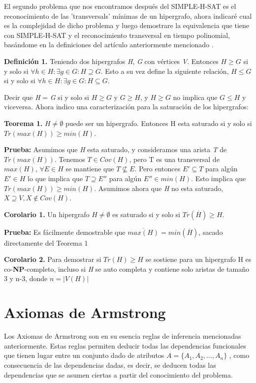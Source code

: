 \documentclass{cosas/tfg_domingo}
\begin{document}
El segundo problema que nos encontramos después del SIMPLE-H-SAT es el reconocimiento de las 'transversals' mínimas de un hipergrafo, ahora indicaré cual es la complejidad de dicho problema y luego demostrare la equivalencia que tiene con SIMPLE-H-SAT y el reconocimiento transversal en tiempo polinomial, basándome en la definiciones del artículo anteriormente mencionado \citep{Thomas}.


\textbf{Definición 1.} Teniendo dos hipergrafos \textit{H}, \textit{G} con vértices \textit{V}. Entonces $H \geq G$ si y solo si $\forall h \in H : \exists g \in G : H \supseteq G$. Esto a su vez define la siguiente relación,  $H \leq G$ si y solo si $\forall h \in H : \exists g \in G : H \subseteq G$.

Decir que  \textit{H} = \textit{G} si y solo si $H \geq G$ y $G \geq H$, y $H \geq G$ no implica que $G \leq H$ y viceversa. Ahora indico una caracterización para la saturación de los hipergrafos:

\textbf{Teorema 1.} $H \neq \emptyset$ puede ser un hipergrafo. Entonces H esta saturado si y solo si $Tr(max(H)) \geq min(H)$.

\textbf{Prueba:} Asumimos que \textit{H} esta saturado, y consideramos una arista \textit{T} de $Tr(max(H))$. Tenemos $T \in Cov(H)$, pero T es una transversal de $max(H)$, $\forall E \in H $ se mantiene que $T \nsubseteq E$. Pero entonces $E' \subseteq T$ para algún $E' \in H$ lo que implica que $T \supseteq E''$ para algún $E'' \in min(H)$. Esto implica que $Tr(max(H)) \geq min(H)$. Asumimos ahora que \textit{H} no esta saturado, $X \supseteq V, X \notin Cov(H)$.

\textbf{Corolario 1.} Un hipergrafo $H \neq \emptyset$ es saturado si y solo si $Tr(\overline{H}) \geq H$.

\textbf{Prueba:} Es fácilmente demostrable que $\overline{max(H)} = min(\overline{H})$, sacado directamente del Teorema 1

\textbf{Corolario 2.} Para demostrar si $Tr(H) \geq H$ se sostiene para un hipergrafo H es co-\textbf{NP}-completo, incluso si \textit{H} se auto completa y contiene solo aristas de tamaño 3 y n-3, donde $n = |V(H)|$

\newpage

\section{Axiomas de Armstrong}

Los Axiomas de Armstrong son en su esencia reglas de inferencia mencionadas anteriormente.
Estas reglas permiten deducir todas las dependencias funcionales que tienen
lugar entre un conjunto dado de atributos $A=\{A_1,A_2,...,A_n\}$ , como consecuencia de las dependencias dadas, es decir, se deducen todas las dependencias que se asumen ciertas a partir del conocimiento del problema.
\end{document}
